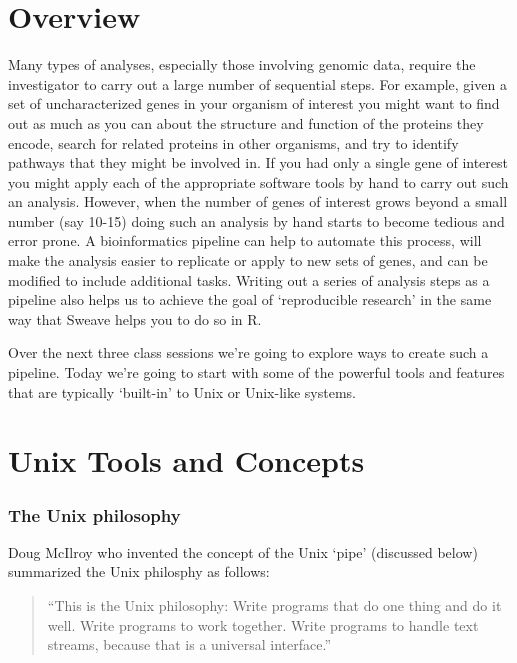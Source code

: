 
 
\section{Overview}

Many types of analyses, especially those involving genomic data, require the investigator to carry out a large number of sequential steps. For example, given a set of uncharacterized genes in your organism of interest you might want to find out as much as you can about the structure and function of the proteins they encode, search for related proteins in other organisms, and try to identify pathways that they might be involved in. If you had only a single gene of interest you might apply each of the appropriate software tools by hand to carry out such an analysis. However, when the number of genes of interest grows beyond a small number (say 10-15) doing such an analysis by hand starts to become tedious and error prone.  A bioinformatics pipeline can help to automate this process, will make the analysis easier to replicate or apply to new sets of genes, and can be modified to include additional tasks.  Writing out a series of analysis steps as a pipeline also helps us to achieve the goal of `reproducible research' in the same way that Sweave helps you to do so in R.

Over the next three class sessions we're going to explore ways to create such a pipeline. Today we're going to start with some of the powerful tools and features that are typically `built-in' to Unix or Unix-like systems.

\section{Unix Tools and Concepts}

\subsubsection{The Unix philosophy}

Doug McIlroy who invented the concept of the Unix `pipe' (discussed below) summarized the Unix philosphy as follows:

\begin{quote}
``This is the Unix philosophy: Write programs that do one thing and do it well. Write programs to work together. Write programs to handle text streams, because that is a universal interface.''
\end{quote}

